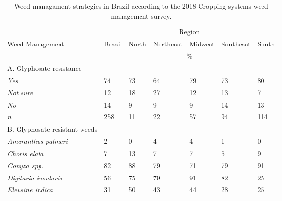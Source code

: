 \documentclass[
  12pt,
  a4paper]{article}
\begin{document}
\begin{table}[ht!]
\centering
\caption{Weed managament strategies in Brazil according to the 2018 Cropping systems weed management survey.}
\label{tab:my-table}
\begin{tabular}{@{}lllllll@{}}
\toprule
                                       & \multicolumn{6}{c}{Region}                               \\ \cmidrule(l){2-7} 
Weed Management                        & Brazil & North & Northeast & Midwest & Southeast & South \\ \hline
                                       & \multicolumn{6}{c}{--------\%--------}                             \\ 
A. Glyphosate resistance               &        &       &           &         &           &       \\
\hspace{3mm}\textit{Yes}                           & 74     & 73    & 64        & 79      & 73        & 80    \\
\hspace{3mm}\textit{Not sure}                      & 12     & 18    & 27        & 12      & 13        & 7     \\
\hspace{3mm}\textit{No}                            & 14     & 9     & 9         & 9       & 14        & 13    \\
\hspace{3mm}\textit{n}                             & 258    & 11    & 22        & 57      & 94        & 114   \\
B. Glyphosate resistant weeds          &        &       &           &         &           &       \\
\hspace{3mm}\textit{Amaranthus palmeri}            & 2      & 0     & 4         & 4       & 1         & 0     \\
\hspace{3mm}\textit{Choris elata}                  & 7      & 13    & 7         & 7       & 6         & 9     \\
\hspace{3mm}\textit{Conyza spp.}                   & 82     & 88    & 79        & 71      & 79        & 91    \\
\hspace{3mm}\textit{Digitaria insularis}           & 56     & 75    & 79        & 91      & 82        & 25    \\
\hspace{3mm}\textit{Eleusine indica}               & 31     & 50    & 43        & 44      & 28        & 25    \\

\end{tabular}
\end{table}
\end{document}
